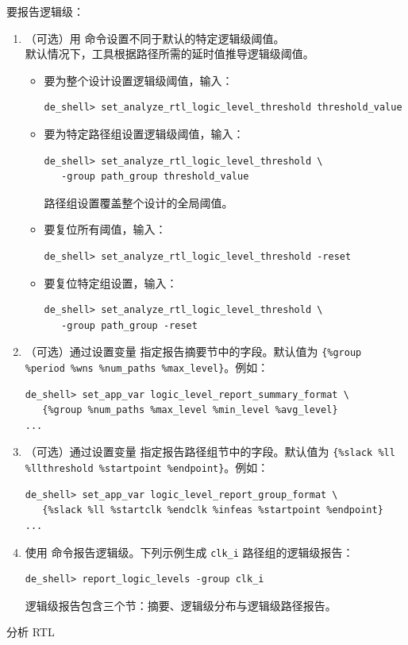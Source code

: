 要报告逻辑级：
\begin{enumerate}
  \item （可选）用  命令设置不同于默认的特定逻辑级阈值。\\
        默认情况下，工具根据路径所需的延时值推导逻辑级阈值。
  \begin{itemize}
    \item 要为整个设计设置逻辑级阈值，输入：
\begin{lstlisting}
de_shell> set_analyze_rtl_logic_level_threshold threshold_value
\end{lstlisting}
    \item 要为特定路径组设置逻辑级阈值，输入：
\begin{lstlisting}
de_shell> set_analyze_rtl_logic_level_threshold \
   -group path_group threshold_value
\end{lstlisting}
          路径组设置覆盖整个设计的全局阈值。
    \item 要复位所有阈值，输入：
\begin{lstlisting}
de_shell> set_analyze_rtl_logic_level_threshold -reset
\end{lstlisting}
    \item 要复位特定组设置，输入：
\begin{lstlisting}
de_shell> set_analyze_rtl_logic_level_threshold \
   -group path_group -reset
\end{lstlisting}
  \end{itemize}

  \item （可选）通过设置变量  指定报告摘要节中的字段。默认值为 \texttt{\{\%group \%period \%wns \%num\_paths \%max\_level\}}。例如：
\begin{lstlisting}
de_shell> set_app_var logic_level_report_summary_format \
   {%group %num_paths %max_level %min_level %avg_level}
...
\end{lstlisting}

  \item （可选）通过设置变量  指定报告路径组节中的字段。默认值为 \texttt{\{\%slack \%ll \%llthreshold \%startpoint \%endpoint\}}。例如：
\begin{lstlisting}
de_shell> set_app_var logic_level_report_group_format \
   {%slack %ll %startclk %endclk %infeas %startpoint %endpoint}
...
\end{lstlisting}

  \item 使用 \cmd{report\_logic\_levels} 命令报告逻辑级。下列示例生成 \texttt{clk\_i} 路径组的逻辑级报告：
\begin{lstlisting}
de_shell> report_logic_levels -group clk_i
\end{lstlisting}
        逻辑级报告包含三个节：摘要、逻辑级分布与逻辑级路径报告。
\end{enumerate}

\begin{seeAlsoBox}
分析 RTL
\end{seeAlsoBox}
